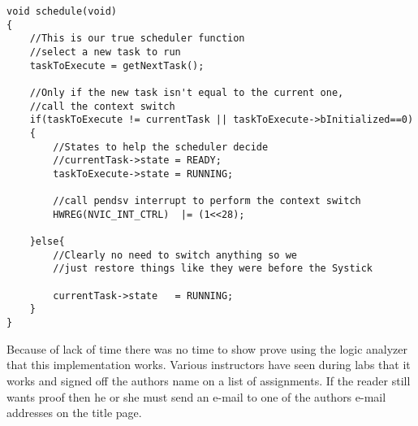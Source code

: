 \begin{lstlisting}[style=CStyle, caption={\texttt{schedule} will call the helper function \texttt{getNextTask} and makes sure that task is actually executed}, captionpos=b, label={lst:versd_new_schedule}, escapechar=@]
void schedule(void)
{
	//This is our true scheduler function
	//select a new task to run
	taskToExecute = getNextTask();

	//Only if the new task isn't equal to the current one,
	//call the context switch
	if(taskToExecute != currentTask || taskToExecute->bInitialized==0)
	{
		//States to help the scheduler decide
		//currentTask->state = READY;
		taskToExecute->state = RUNNING;

		//call pendsv interrupt to perform the context switch
		HWREG(NVIC_INT_CTRL)  |= (1<<28);

	}else{
		//Clearly no need to switch anything so we
		//just restore things like they were before the Systick

		currentTask->state	 = RUNNING;
	}
}
\end{lstlisting}

Because of lack of time there was no time to show prove using the logic analyzer that this implementation works.
Various instructors have seen during labs that it works and signed off the authors name on a list of assignments.
If the reader still wants proof then he or she must send an e-mail to one of the authors e-mail addresses on the title page.


